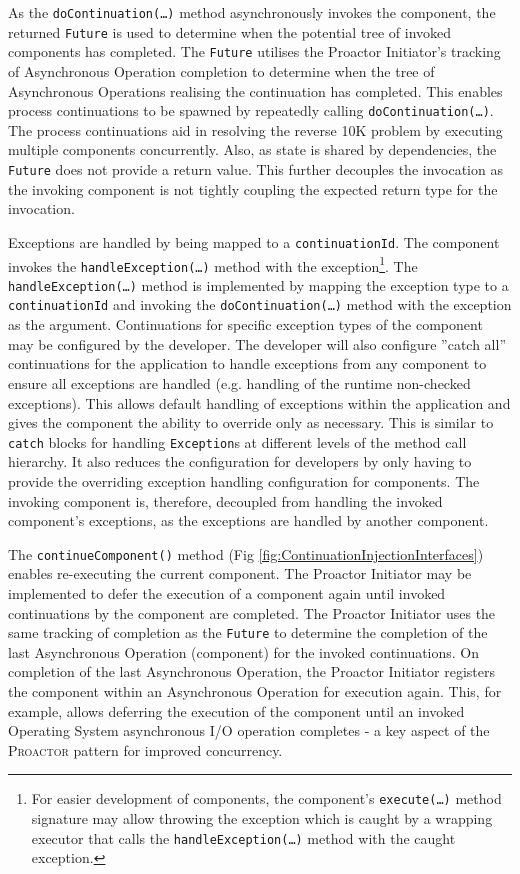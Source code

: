 \documentclass[prodmode]{style/acmlarge}
\begin{document}
As the \texttt{doContinuation(\ldots)} method asynchronously invokes the
component, the returned \texttt{Future} is used to determine when the potential
tree of invoked components has completed.  The \texttt{Future} utilises the
Proactor Initiator's tracking of Asynchronous Operation completion to determine
when the tree of Asynchronous Operations realising the continuation has
completed.  This enables process continuations \cite{process-continuation} to be
spawned by repeatedly calling \texttt{doContinuation(\ldots)}.  The process
continuations aid in resolving the reverse 10K problem
\cite{reverse-ten-k-problem} by executing multiple components concurrently.
Also, as state is shared by dependencies, the \texttt{Future} does not provide a
return value.  This further decouples the invocation as the invoking component
is not tightly coupling the expected return type for the invocation.

Exceptions are handled by being mapped to a \texttt{continuationId}.  The
component invokes the \texttt{handle\-Excep\-tion(\ldots)} method with the
exception\footnote{For easier development of components, the component's
\texttt{execute(\ldots)} method signature may allow throwing the exception which
is caught by a wrapping executor that calls the \texttt{handleException(\ldots)}
method with the caught exception.}.  The \texttt{handleException(\ldots)} method
is implemented by mapping the exception type to a \texttt{continuationId} and
invoking the \texttt{doContinuation(\ldots)} method with the exception as the argument.
Continuations for specific exception types of the component may be configured by
the developer.  The developer will also configure ''catch all'' continuations
for the application to handle exceptions from any component to ensure all
exceptions are handled (e.g. handling of the runtime non-checked exceptions).
This allows default handling of exceptions within the application and gives the
component the ability to override only as necessary.  This is similar to
\texttt{catch} blocks for handling \texttt{Exception}s at different levels of the
method call hierarchy.  It also reduces the configuration for developers by only
having to provide the overriding exception handling configuration for
components.  The invoking component is, therefore, decoupled from handling the
invoked component's exceptions, as the exceptions are handled by another
component.

The \texttt{continueComponent()} method (Fig
\ref{fig:ContinuationInjectionInterfaces}) enables re-executing the current
component.  The Proactor Initiator may be implemented to defer the execution of a
component again until invoked continuations by the component are completed.
 The Proactor Initiator uses the same tracking of completion as the
\texttt{Future} to determine the completion of the last Asynchronous Operation
(component) for the invoked continuations.  On completion of the last
Asynchronous Operation, the Proactor Initiator registers the component within an
Asynchronous Operation for execution again.  This, for example, allows deferring
the execution of the component until an invoked Operating System asynchronous
I/O operation completes - a key aspect of the \textsc{Proactor} pattern for
improved concurrency.
\end{document}
